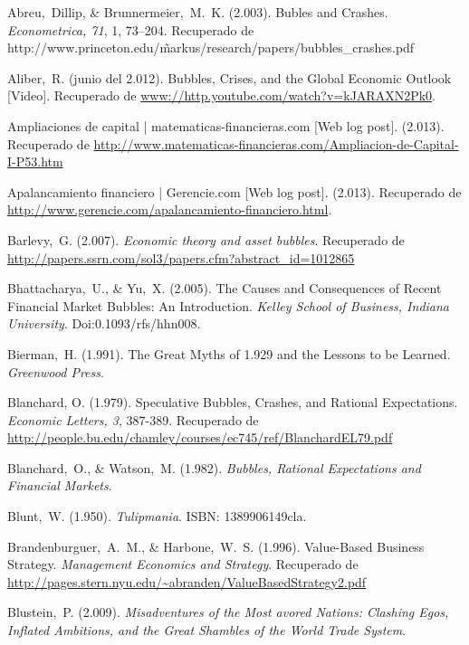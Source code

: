 


\begin{thebibliography}{11}
	
	\bibitem{}
		Abreu, Dillip, \& Brunnermeier, M. K. (2.003). Bubles and Crashes. \emph{Econometrica, 71}, 1, 73–204. Recuperado de http://www.princeton.edu/\~markus/research/papers/bubbles\_crashes.pdf

	\bibitem{}
		Aliber, R. (junio del 2.012). Bubbles, Crises, and the Global Economic Outlook [Video]. Recuperado de \url{www://http.youtube.com/watch?v=kJARAXN2Pk0}.

	\bibitem{}
		Ampliaciones de capital | matematicas-financieras.com [Web log post]. (2.013). Recuperado de \url{http://www.matematicas-financieras.com/Ampliacion-de-Capital-I-P53.htm} 	

	\bibitem{}
		Apalancamiento financiero | Gerencie.com [Web log post]. (2.013). Recuperado de \url{http://www.gerencie.com/apalancamiento-financiero.html}.

	\bibitem{}
		Barlevy, G. (2.007). \emph{Economic theory and asset bubbles}. Recuperado de \url{http://papers.ssrn.com/sol3/papers.cfm?abstract\_id=1012865}
		
	\bibitem{}
		Bhattacharya, U., \& Yu, X. (2.005). The Causes and Consequences of Recent Financial Market Bubbles: An Introduction. \emph{Kelley School of Business, Indiana University}. Doi:0.1093/rfs/hhn008.

	\bibitem{}
		Bierman, H. (1.991). The Great Myths of 1.929 and the Lessons to be Learned. \emph{Greenwood Press}. 

	\bibitem{}
		Blanchard, O. (1.979). Speculative Bubbles, Crashes, and Rational Expectations. \emph{Economic Letters, 3}, 387-389. Recuperado de \url{http://people.bu.edu/chamley/courses/ec745/ref/BlanchardEL79.pdf}

	\bibitem{}
		Blanchard, O., \& Watson, M. (1.982). \emph{Bubbles, Rational Expectations and Financial Markets}. 
	
	\bibitem{}
		Blunt, W. (1.950). \emph{Tulipmania}. ISBN: 1389906149cla.	 

	\bibitem{}
		Brandenburguer, A. M., \& Harbone, W. S. (1.996). Value-Based Business Strategy. \emph{Management Economics and Strategy}. Recuperado de \url{http://pages.stern.nyu.edu/~abranden/ValueBasedStrategy2.pdf}

	\bibitem{}
		Blustein, P. (2.009). \emph{Misadventures of the Most avored Nations: Clashing Egos, Inflated Ambitions, and the Great Shambles of the World Trade System}. 


\end{thebibliography}
